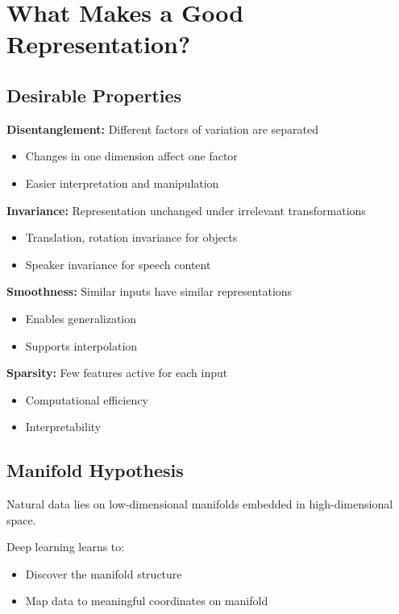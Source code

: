 
\section{What Makes a Good Representation? }
\label{sec:good-representations}

\subsection{Desirable Properties}

\textbf{Disentanglement:} Different factors of variation are separated
\begin{itemize}
    \item Changes in one dimension affect one factor
    \item Easier interpretation and manipulation
\end{itemize}

\textbf{Invariance:} Representation unchanged under irrelevant transformations
\begin{itemize}
    \item Translation, rotation invariance for objects
    \item Speaker invariance for speech content
\end{itemize}

\textbf{Smoothness:} Similar inputs have similar representations
\begin{itemize}
    \item Enables generalization
    \item Supports interpolation
\end{itemize}

\textbf{Sparsity:} Few features active for each input
\begin{itemize}
    \item Computational efficiency
    \item Interpretability
\end{itemize}

\subsection{Manifold Hypothesis}

Natural data lies on low-dimensional manifolds embedded in high-dimensional space.

Deep learning learns to:
\begin{itemize}
    \item Discover the manifold structure
    \item Map data to meaningful coordinates on manifold
\end{itemize}

